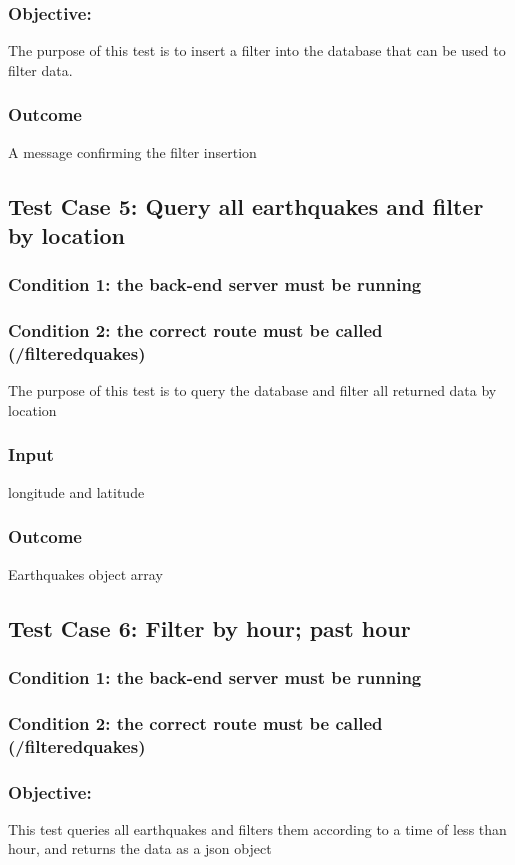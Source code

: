 \subsubsection{Objective:} The purpose of this test is to insert a filter into the database that can be used to filter data.
\subsubsection{Outcome}
A message confirming the filter insertion

\subsection{Test Case 5: Query all earthquakes and filter by location}
\subsubsection{Condition 1: the back-end server must be running}
\subsubsection{Condition 2: the correct route must be called (/filteredquakes)} The purpose of this test is to query the database and filter all returned data by location
\subsubsection{Input}
{longitude and latitude}
\subsubsection{Outcome}
Earthquakes object array

\subsection{Test Case 6: Filter by hour; past hour}

\subsubsection{Condition 1: the back-end server must be running}
\subsubsection{Condition 2: the correct route must be called (/filteredquakes)}
\subsubsection{Objective: } This test queries all earthquakes and filters them according to a time of less than hour, and returns the data as a json object
